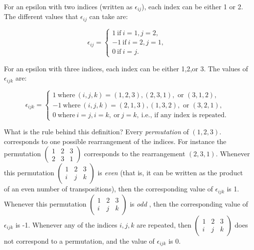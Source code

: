 For an epsilon with two indices (written as $\epsilon_{ij}$), each index can be either 1 or 2. The different values that $\epsilon_{ij}$ can take are:

\[ \epsilon_{ij}=
\begin{cases}
1 ~ \text{if} ~ i=1, j=2,  \\
-1 ~ \text{if} ~ i=2, j=1,  \\
0 ~ \text{if} ~ i=j.
\end{cases} \]

For an epsilon with three indices, each index can be either 1,2,or 3. The values of $\epsilon_{ijk}$ are:

\[ \epsilon_{ijk}=
\begin{cases}
1 ~ \text{where} ~ (i,j,k)= (1,2,3),  (2,3,1),  \text{~or~}(3,1,2), \\
-1 ~ \text{where} ~ (i,j,k) = (2,1,3), (1,3,2),  \text{~or~}(3,2,1),  \\
0 ~ \text{where} ~  i=j, i=k, ~ \text{or} ~ j=k, ~ \text{i.e., if any index is repeated.}
\end{cases} \]

What is the rule behind this definition?  Every \emph{permutation} of $(1,2,3)$.  corresponds to one possible rearrangement of the indices. For instance the permutation 
$ \left( \begin{smallmatrix}  1 & 2 & 3  \\ 2 & 3 & 1  \end{smallmatrix} \right)$ corresponds to the rearrangement $(2,3,1)$.  Whenever this permutation $\left( \begin{smallmatrix} 1 & 2 & 3  \\ i & j & k  \end{smallmatrix} \right) $ is \emph{even} (that is, it can be written as the product of an even number of transpositions), then the corresponding value of $\epsilon_{ijk}$ is 1. Whenever this permutation $\left( \begin{smallmatrix} 1 & 2 & 3  \\ i & j & k  \end{smallmatrix} \right)$ is \emph{odd} , then the corresponding value of $\epsilon_{ijk}$ is -1. Whenever any of the indices $i,j,k$  are repeated, then  $\left( \begin{smallmatrix} 1 & 2 & 3  \\ i & j & k  \end{smallmatrix} \right) $ does not correspond to a permutation, and the value of $\epsilon_{ijk}$ is 0.

